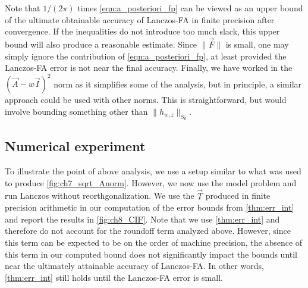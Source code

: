 Note that \( 1/(2\pi) \) times \cref{eqn:a_posteriori_fp} can be viewed as an upper bound of the ultimate obtainable  accuracy of Lanczos-FA in finite precision after convergence.
 If the inequalities do not introduce too much slack, this upper bound will also produce a reasonable estimate.
Since \( \| \vec{F} \| \) is small, one may simply ignore the contribution of \cref{eqn:a_posteriori_fp}, at least provided the Lanczos-FA error is not near the final accuracy.
Finally, we have worked in the \( (\vec{A}-w\vec{I})^2 \) norm as it simplifies some of the analysis, but in principle, a similar approach could be used with other norms.
This is straightforward, but would involve bounding something other than \( \|h_{w,z}\|_{S_0} \).

\subsection{Numerical experiment}



To illustrate the point of above analysis, we use a setup similar to what was used to produce \cref{fig:ch7_sqrt_Anorm}.
However, we now use the model problem and run Lanczos without reorthgonalization.
We use the \( \vec{T} \) produced in finite precision arithmetic in our computation of the error bounds from \cref{thm:err_int} and report the results in \cref{fig:ch8_CIF}.
Note that we use \cref{thm:err_int} and therefore do not account for the roundoff term analyzed above. 
However, since this term can be expected to be on the order of machine precision, the absence of this term in our computed bound does not significantly impact the bounds until near the ultimately attainable accuracy of Lanczos-FA. 
In other words, \cref{thm:err_int} still holds until the Lanczos-FA error is small.




